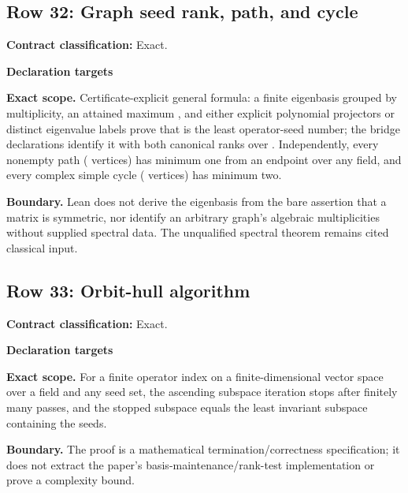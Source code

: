 \subsection{Row 32: Graph seed rank, path, and cycle}
\label{row:32}
\textbf{Contract classification:} Exact.
\par\smallskip\textbf{Declaration targets}\par
{\small\noindent{}\par}
{\small\noindent{}\par}
{\small\noindent{}\par}
{\small\noindent{}\par}
{\small\noindent{}\par}
{\small\noindent{}\par}
\medskip\noindent\textbf{Exact scope.} Certificate-explicit general formula: a finite eigenbasis grouped by multiplicity, an attained maximum , and either explicit polynomial projectors or distinct eigenvalue labels prove that  is the least operator-seed number; the bridge declarations identify it with both canonical ranks over . Independently, every nonempty path ( vertices) has minimum one from an endpoint over any field, and every complex simple cycle ( vertices) has minimum two.
\par\smallskip\noindent\textbf{Boundary.} Lean does not derive the eigenbasis from the bare assertion that a matrix is symmetric, nor identify an arbitrary graph's algebraic multiplicities without supplied spectral data. The unqualified spectral theorem remains cited classical input.
\medskip
\subsection{Row 33: Orbit-hull algorithm}
\label{row:33}
\textbf{Contract classification:} Exact.
\par\smallskip\textbf{Declaration targets}\par
{\small\noindent{}\par}
{\small\noindent{}\par}
\medskip\noindent\textbf{Exact scope.} For a finite operator index on a finite-dimensional vector space over a field and any seed set, the ascending subspace iteration stops after finitely many passes, and the stopped subspace equals the least invariant subspace containing the seeds.
\par\smallskip\noindent\textbf{Boundary.} The proof is a mathematical termination/correctness specification; it does not extract the paper's basis-maintenance/rank-test implementation or prove a complexity bound.
\medskip
